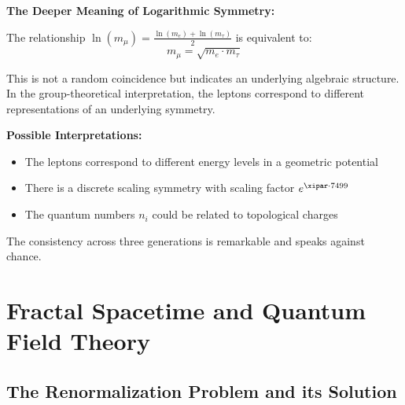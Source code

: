 	\begin{treatise}
		\textbf{The Deeper Meaning of Logarithmic Symmetry:}
		
		The relationship $\ln(m_\mu) = \frac{\ln(m_e) + \ln(m_\tau)}{2}$ is equivalent to:
		\begin{equation}
			m_\mu = \sqrt{m_e \cdot m_\tau}
		\end{equation}
		
		This is not a random coincidence but indicates an underlying algebraic structure. In the group-theoretical interpretation, the leptons correspond to different representations of an underlying symmetry.
		
		\textbf{Possible Interpretations:}
		\begin{itemize}
			\item The leptons correspond to different energy levels in a geometric potential
			\item There is a discrete scaling symmetry with scaling factor $e^{\xipar \cdot 7499}$
			\item The quantum numbers $n_i$ could be related to topological charges
		\end{itemize}
		
		The consistency across three generations is remarkable and speaks against chance.
	\end{treatise}
	
	\section{Fractal Spacetime and Quantum Field Theory}
	
	\subsection{The Renormalization Problem and its Solution}
	
